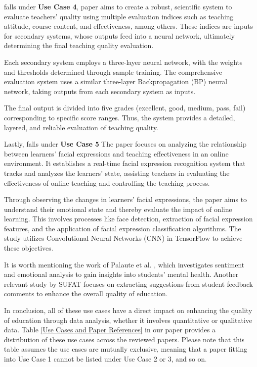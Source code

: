 falls under \textbf{Use Case 4}, paper \cite{BP_Neural_Network-Based_Evaluation_on_University_Teachers'_Teaching_Quality} aims to create a robust, scientific system to evaluate teachers' quality using multiple evaluation indices such as teaching attitude, course content, and effectiveness, among others. These indices are inputs for secondary systems, whose outputs feed into a neural network, ultimately determining the final teaching quality evaluation. 

Each secondary system employs a three-layer neural network, with the weights and thresholds determined through sample training. The comprehensive evaluation system uses a similar three-layer Backpropagation (BP) neural network, taking outputs from each secondary system as inputs. 

The final output is divided into five grades (excellent, good, medium, pass, fail) corresponding to specific score ranges. Thus, the system provides a detailed, layered, and reliable evaluation of teaching quality.

Lastly, falls under \textbf{Use Case 5} 
The paper focuses on analyzing the relationship between learners' facial expressions and teaching effectiveness in an online environment. It establishes a real-time facial expression recognition system that tracks and analyzes the learners' state, assisting teachers in evaluating the effectiveness of online teaching and controlling the teaching process.


Through observing the changes in learners' facial expressions, the paper aims to understand their emotional state and thereby evaluate the impact of online learning. This involves processes like face detection, extraction of facial expression features, and the application of facial expression classification algorithms. The study utilizes Convolutional Neural Networks (CNN) in TensorFlow to achieve these objectives.

It is worth mentioning the work of Palaute et al. \cite{Palaute:_An_Online_Text_Mining_Tool_for_Analyzing_Written_Student_Course_Feedback}, which investigates sentiment and emotional analysis to gain insights into students' mental health. Another relevant study by SUFAT \cite{SUFAT_An_Analytics_Tool_for_Gaining_Insights_from_Student_Feedback_Comments} focuses on extracting suggestions from student feedback comments to enhance the overall quality of education.

In conclusion, all of these use cases have a direct impact on enhancing the quality of education through data analysis, whether it involves quantitative or qualitative data. Table \ref{Use Cases and Paper References} in our paper provides a distribution of these use cases across the reviewed papers. Please note that this table assumes the use cases are mutually exclusive, meaning that a paper fitting into Use Case 1 cannot be listed under Use Case 2 or 3, and so on.


